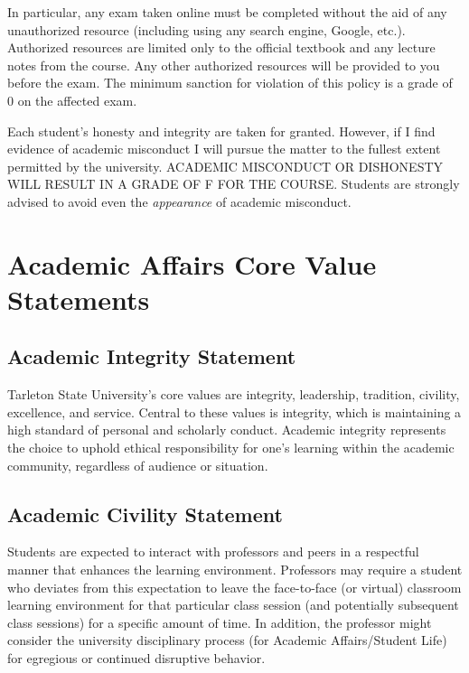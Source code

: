 \documentclass[10pt]{article}
\begin{document}
In particular, any exam taken online must be completed without the aid of any unauthorized resource (including using any search engine, Google, etc.).  Authorized resources are limited only to the official textbook and any lecture notes from the course.  Any other authorized resources will be provided to you before the exam.  The minimum sanction for violation of this policy is a grade of 0 on the affected exam.

Each student’s honesty and integrity are taken for granted. However, if I find evidence of academic misconduct I will pursue the matter to the fullest extent permitted by the university. ACADEMIC MISCONDUCT OR DISHONESTY WILL RESULT IN A GRADE OF F FOR THE COURSE.  Students are strongly advised to avoid even the \emph{appearance} of academic misconduct. 

\section*{Academic Affairs Core Value Statements}
\label{sec:org3fd2bc1}
\subsection*{Academic Integrity Statement}
\label{sec:orgc2c4bb9}
Tarleton State University's core values are integrity, leadership, tradition, civility, excellence, and service.  Central to these values is integrity, which is maintaining a high standard of personal and scholarly conduct.  Academic integrity represents the choice to uphold ethical responsibility for one’s learning within the academic community, regardless of audience or situation.

\subsection*{Academic Civility Statement}
\label{sec:org4456aec}
Students are expected to interact with professors and peers in a respectful manner that enhances the learning environment. Professors may require a student who deviates from this expectation to leave the face-to-face (or virtual) classroom learning environment for that particular class session (and potentially subsequent class sessions) for a specific amount of time. In addition, the professor might consider the university disciplinary process (for Academic Affairs/Student Life) for egregious or continued disruptive behavior.
\end{document}
